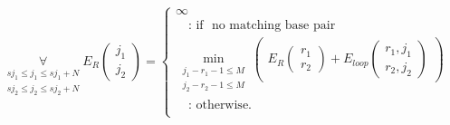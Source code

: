 \begin{equation*}
\underset{\substack{sj_{1} \le j_{1} \le sj_{1}+N\\sj_{2} \le j_{2} \le sj_{2}+N}}{\forall}
E_R(\substack{j_1\\j_2}) = \begin{cases}
\infty\\
\quad\text{: if } \text{ no matching base pair }\\
\min\limits_{\substack{j_{1}-r_{1}-1 \le M\\j_{2}-r_{2}-1 \le M}}
\begin{pmatrix}
E_R(\substack{r_1\\r_2}) + E_{loop}(\substack{r_1,j_1\\r_2,j_2})
\end{pmatrix}\\
\quad\text{: otherwise.}\\

\end{cases}
\end{equation*}

